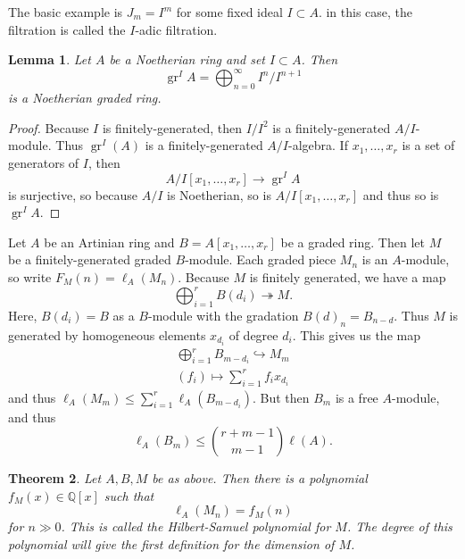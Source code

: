 \documentclass[leqno, openany]{memoir}
\newtheorem{thm}{Theorem}[section]
\newtheorem{lem}[thm]{Lemma}
\theoremstyle{definition}
\theoremstyle{remark}
\theoremstyle{plain}
\theoremstyle{definition}
\theoremstyle{remark}
\newcommand{\Q}{\mathbb{Q}}
\begin{document}
The basic example is $J_m = I^m$ for some fixed ideal $I \subset A$. in this
case, the filtration is called the $I$-adic filtration.

\begin{lem} Let $A$ be a Noetherian ring and set $I \subset A$. Then \[
\operatorname{gr}^I A = \bigoplus_{n=0}^{\infty} I^n / I^{n+1} \] is a
Noetherian graded ring.  \end{lem}

\begin{proof} Because $I$ is finitely-generated, then $I / I^2$ is a
    finitely-generated $A/I$-module. Thus $\operatorname{gr}^I(A)$ is a
    finitely-generated $A/I$-algebra. If $x_1, \ldots, x_r$ is a set of
    generators of $I$, then \[ A/I[x_1, \ldots, x_r] \to \operatorname{gr}^I A
    \] is surjective, so because $A/I$ is Noetherian, so is $A/I[x_1, \ldots,
x_r]$ and thus so is $\operatorname{gr}^IA$.  \end{proof}

Let $A$ be an Artinian ring and $B = A[x_1, \ldots, x_r]$ be a graded ring.
Then let $M$ be a finitely-generated graded $B$-module. Each graded piece $M_n$
is an $A$-module, so write $F_M(n) = \ell_A(M_n)$. Because $M$ is finitely
generated, we have a map \[ \bigoplus_{i=1}^r B(d_i) \twoheadrightarrow M. \]
Here, $B(d_i) = B$ as a $B$-module with the gradation $B(d)_n = B_{n-d}$. Thus
$M$ is generated by homogeneous elements $x_{d_i}$ of degree $d_i$. This gives
us the map \begin{align*} \bigoplus_{i=1}^r B_{m-d_i} \hookrightarrow M_m \\
    (f_i) \mapsto \sum_{i=1}^r f_i x_{d_i} \end{align*} and thus $\ell_A(M_m)
    \leq \sum_{i=1}^r \ell_A(B_{m-d_i})$. But then $B_m$ is a free $A$-module,
    and thus \[ \ell_A(B_m) \leq \binom{r+m-1}{m-1} \ell(A). \]

\begin{thm} Let $A, B,M$ be as above. Then there is a polynomial $f_M(x) \in
    \Q[x]$ such that \[ \ell_A(M_n) = f_M(n) \] for $n \gg 0$. This is called
    the \textit{Hilbert-Samuel polynomial} for $M$. The degree of this
    polynomial will give the first definition for the dimension of $M$.
\end{thm}
\end{document}

